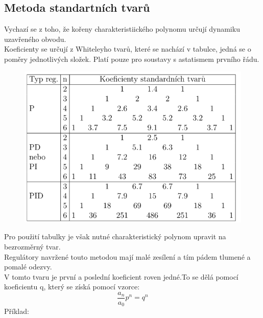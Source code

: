 \subsection*{Metoda standartních tvarů}
Vychazí se z toho, že kořeny charakteristiického polynomu určují dynamiku uzavřeného obvodu.\\
Koeficienty se určují z Whiteleyho tvarů, které se nachází v tabulce, jedná se o poměry jednotlivých složek. Platí pouze pro soustavy s astatismem prvního řádu.\\
\begin{figure}[H]
    \centering
    \includegraphics*[scale = 0.8]{images/metodaStandartnichTvaru.png}
\end{figure}
Pro použití tabulky je však nutné charakteristický polynom upravit na bezrozměrný tvar.\\
Regulátory navržené touto metodou mají malé zesílení a tím pádem tlumené a pomalé odezvy.\\
V tomto tvaru je první a poslední koeficient roven jedné.To se dělá pomocí koeficientu q, který se získá pomocí vzorce:
\begin{equation}
    \frac{a_n}{a_0}p^n = q^n
\end{equation}
Příklad:\\
